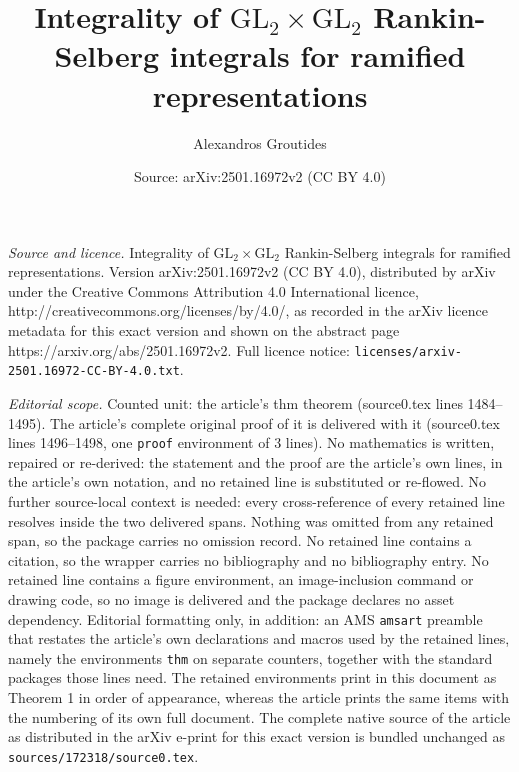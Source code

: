 \documentclass[10pt,a4paper]{amsart}
\title{Integrality of $\mathrm{GL}_2\times\mathrm{GL}_2$ Rankin-Selberg integrals for ramified representations}
\author{Alexandros Groutides}
\date{Source: arXiv:2501.16972v2 (CC BY 4.0)}
\begin{document}
\maketitle

\noindent\emph{Source and licence.} Integrality of $\mathrm{GL}_2\times\mathrm{GL}_2$ Rankin-Selberg integrals for ramified representations. Version arXiv:2501.16972v2 (CC BY 4.0), distributed by arXiv under the Creative Commons Attribution 4.0 International licence, http://creativecommons.org/licenses/by/4.0/, as recorded in the arXiv licence metadata for this exact version and shown on the abstract page https://arxiv.org/abs/2501.16972v2. Full licence notice: \texttt{licenses/arxiv-2501.16972-CC-BY-4.0.txt}.\par\smallskip

\noindent\textit{Editorial scope.} Counted unit: the article's thm theorem (source0.tex lines 1484--1495). The article's complete original proof of it is delivered with it (source0.tex lines 1496--1498, one \texttt{proof} environment of 3 lines). No mathematics is written, repaired or re-derived: the statement and the proof are the article's own lines, in the article's own notation, and no retained line is substituted or re-flowed.  No further source-local context is needed: every cross-reference of every retained line resolves inside the two delivered spans.  Nothing was omitted from any retained span, so the package carries no omission record.  No retained line contains a citation, so the wrapper carries no bibliography and no bibliography entry.  No retained line contains a figure environment, an image-inclusion command or drawing code, so no image is delivered and the package declares no asset dependency.  Editorial formatting only, in addition: an AMS \texttt{amsart} preamble that restates the article's own declarations and macros used by the retained lines, namely the environments \texttt{thm} on separate counters, together with the standard packages those lines need.  The retained environments print in this document as Theorem 1 in order of appearance, whereas the article prints the same items with the numbering of its own full document.  The complete native source of the article as distributed in the arXiv e-print for this exact version is bundled unchanged as \texttt{sources/172318/source0.tex}.
\end{document}
